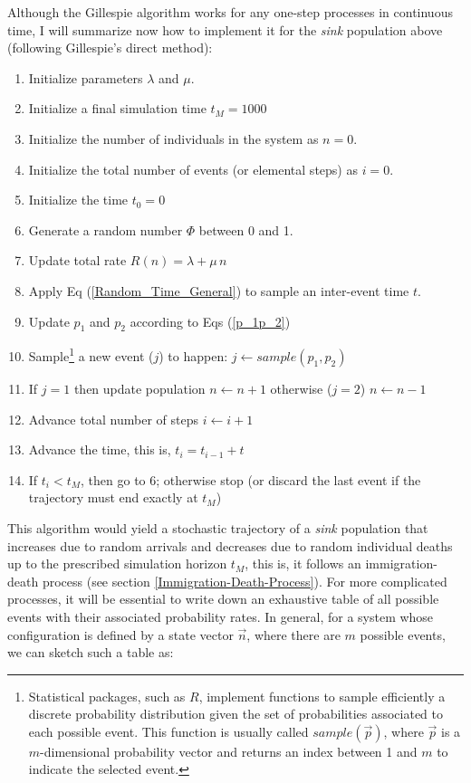 Although the Gillespie algorithm works for any one-step processes in continuous time, I will summarize now how to implement it for the \textit{sink} population above (following Gillespie's direct method):
\begin{enumerate}
	\item Initialize parameters $\lambda$ and $\mu$. 
	\item Initialize a final simulation time $t_M = 1000$
	\item Initialize the number of individuals in the system as $n=0$.
	\item Initialize the total number of events (or elemental steps) as $i=0$.
	\item Initialize the time $t_0 = 0$
	\item Generate a random number $\Phi$ between 0 and 1.
	\item Update total rate $R(n) = \lambda + \mu\,n$ 
	\item Apply Eq (\ref{Random_Time_General}) to sample an inter-event time $t$.
	\item Update $p_1$ and $p_2$ according to Eqs (\ref{p_1p_2}) 
	\item Sample\footnote{Statistical packages, such as $R$, implement functions to sample efficiently a discrete probability distribution given the set of probabilities associated to each possible event. This function is usually called $sample(\vec{p})$, where $\vec{p}$ is a $m$-dimensional probability vector and returns an index between 1 and $m$ to indicate the selected event.} a new event ($j$) to happen: $j \leftarrow sample(p_1, p_2)$ 
	\item If $j=1$ then update population $n \leftarrow n+1$ otherwise ($j=2$) $n \leftarrow n-1$
	\item Advance total number of steps $i \leftarrow i + 1$
	\item Advance the time, this is, $t_i = t_{i-1} + t$
	\item If $t_i < t_M$, then go to 6; otherwise stop (or discard the last event if the trajectory must end exactly at $t_M$)
\end{enumerate}
This algorithm would yield a stochastic trajectory of a \textit{sink} population that increases due to random arrivals and decreases due to random individual deaths up to the prescribed simulation horizon $t_M$, this is, it follows an immigration-death process (see section \ref{Immigration-Death-Process}). For more complicated processes, it will be essential to write down an exhaustive table of all possible events with their associated probability rates. In general, for a system whose configuration is defined by a state vector $\vec{n}$, where there are $m$ possible events, we can sketch such a table as:
